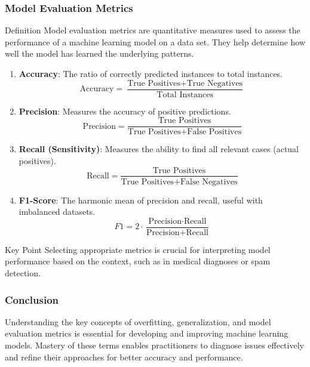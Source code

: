 \documentclass[aspectratio=169]{beamer}
\begin{document}
\begin{frame}[fragile]
    \frametitle{Model Evaluation Metrics}
    \begin{block}{Definition}
        Model evaluation metrics are quantitative measures used to assess the performance of a machine learning model on a data set. They help determine how well the model has learned the underlying patterns.
    \end{block}

    \begin{enumerate}
        \item \textbf{Accuracy}: The ratio of correctly predicted instances to total instances.
            \[
            \text{Accuracy} = \frac{\text{True Positives} + \text{True Negatives}}{\text{Total Instances}}
            \]
        \item \textbf{Precision}: Measures the accuracy of positive predictions.
            \[
            \text{Precision} = \frac{\text{True Positives}}{\text{True Positives} + \text{False Positives}}
            \]
        \item \textbf{Recall (Sensitivity)}: Measures the ability to find all relevant cases (actual positives).
            \[
            \text{Recall} = \frac{\text{True Positives}}{\text{True Positives} + \text{False Negatives}}
            \]
        \item \textbf{F1-Score}: The harmonic mean of precision and recall, useful with imbalanced datasets.
            \[
            F1 = 2 \cdot \frac{\text{Precision} \cdot \text{Recall}}{\text{Precision} + \text{Recall}}
            \]
    \end{enumerate}

    \begin{block}{Key Point}
        Selecting appropriate metrics is crucial for interpreting model performance based on the context, such as in medical diagnoses or spam detection.
    \end{block}
\end{frame}

\begin{frame}[fragile]
    \frametitle{Conclusion}
    Understanding the key concepts of overfitting, generalization, and model evaluation metrics is essential for developing and improving machine learning models. Mastery of these terms enables practitioners to diagnose issues effectively and refine their approaches for better accuracy and performance.
\end{frame}
\end{document}
